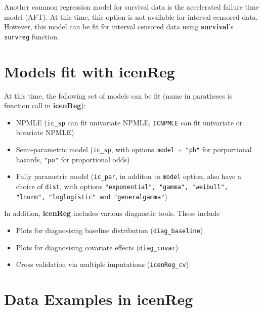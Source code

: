 \documentclass[11pt]{report}
\begin{document}
  Another common regression model for survival data is the accelerated failure time model (AFT).
  At this time, this option is not available for interval censored data. However, this model
  can be fit for interval censored data using {\bf survival}'s \texttt{survreg} function. 
  
\section{Models fit with {\bf{icenReg}} }

  At this time, the following set of models can 
  be fit (name in paratheses is function call in {\bf{icenReg}}):
  
  \begin{itemize}
  
    \item NPMLE (\texttt{ic\_sp} can fit univariate NPMLE, \texttt{ICNPMLE} can fit univariate or bivariate NPMLE)
  
    \item Semi-parametric model (\texttt{ic\_sp}, with options \texttt{model = "ph"} for 
    porportional hazards, \texttt{"po"} for proportional odds)
    
    \item Fully parametric model (\texttt{ic\_par}, in additon to \texttt{model} option, also 
    have a choice of \texttt{dist}, with options \texttt{"exponential", "gamma", "weibull", "lnorm", "loglogistic" and "generalgamma"})
  
  \end{itemize}
  
  In addition, {\bf{icenReg}} includes various diagnostic tools. These include
  
  \begin{itemize}
  
    \item Plots for diagnosising baseline distribution (\texttt{diag\_baseline})
    
    \item Plots for diagnosising covariate effects (\texttt{diag\_covar})
    
    \item Cross validation via multiple imputations (\texttt{icenReg\_cv})
  
  \end{itemize}
  
  
  \section{Data Examples in {\bf{icenReg}} }
  
\end{document}
